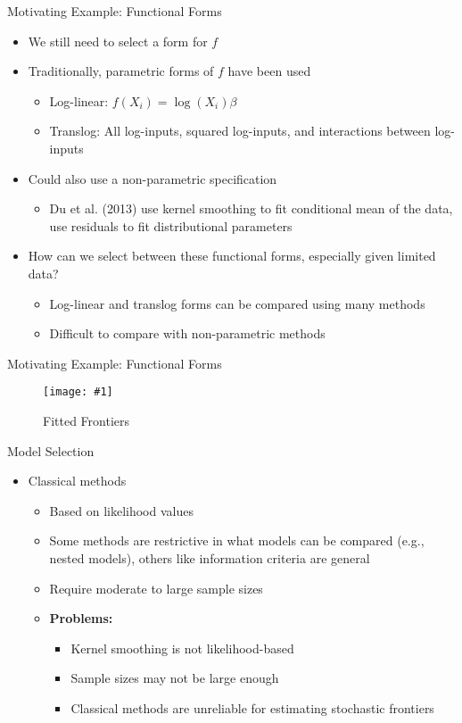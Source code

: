 \documentclass{beamer}
\newcommand{\img}[1]{\texttt{[image: \#1]}}
\begin{document}
\begin{frame}{Motivating Example: Functional Forms}
\begin{itemize}
	\item We still need to select a form for $f$
	\item Traditionally, parametric forms of $f$ have been used
		\begin{itemize}
			\item Log-linear: $f(X_i) = \log(X_i)\beta$
			\item Translog: All log-inputs, squared log-inputs, and interactions between log-inputs
		\end{itemize}
	\item Could also use a non-parametric specification
		\begin{itemize}
			\item Du et al. (2013) use kernel smoothing to fit conditional mean of the data, use residuals to fit distributional parameters
		\end{itemize}
	\item How can we select between these functional forms, especially given limited data?
		\begin{itemize}
			\item Log-linear and translog forms can be compared using many methods
			\item Difficult to compare with non-parametric methods
		\end{itemize}
\end{itemize}
\end{frame}

\begin{frame}{Motivating Example: Functional Forms}
\begin{figure}
	\centering
	\img{figures/func-forms.pdf}
	\caption{Fitted Frontiers}
\end{figure}
\end{frame}

\begin{frame}{Model Selection}
\begin{itemize}
	\item Classical methods
		\begin{itemize}
			\item Based on likelihood values
			\item Some methods are restrictive in what models can be compared (e.g., nested models), others like information criteria are general
			\item Require moderate to large sample sizes
			\item \textbf{Problems:}
				\begin{itemize}
					\item Kernel smoothing is not likelihood-based
					\item Sample sizes may not be large enough
					\item Classical methods are unreliable for estimating stochastic frontiers
				\end{itemize}
		\end{itemize}
\end{itemize}
\end{frame}
\end{document}

